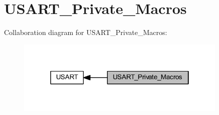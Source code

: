 \hypertarget{group___u_s_a_r_t___private___macros}{}\section{U\+S\+A\+R\+T\+\_\+\+Private\+\_\+\+Macros}
\label{group___u_s_a_r_t___private___macros}
Collaboration diagram for U\+S\+A\+R\+T\+\_\+\+Private\+\_\+\+Macros\+:
\nopagebreak
\begin{figure}[H]
\begin{center}
\leavevmode
\includegraphics[width=286pt]{group___u_s_a_r_t___private___macros}
\end{center}
\end{figure}
